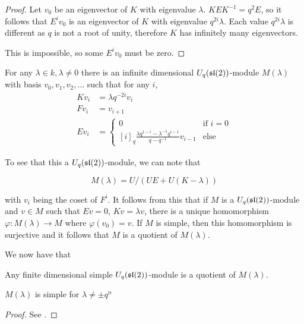 \begin{proof}
    Let $v_0$ be an eigenvector of $K$ with eigenvalue $\lambda$. $KEK^{-1} =
    q^2 E$, so it follows that $E^i v_0$ is an eigenvector of $K$ with
    eigenvalue $q^{2i}\lambda$. Each value $q^{2i}\lambda$ is different as $q$
    is not a root of unity, therefore $K$ has infinitely many eigenvectors. 

    This is impossible, so some $E^i v_0$ must be zero.
\end{proof}

For any $\lambda \in k, \lambda \neq 0$ there is an infinite dimensional
$U_q(\mathfrak{sl}(2))$-module $M(\lambda)$ with basis $v_0, v_1, v_2, \ldots$ such that
for any $i$,
\begin{align}
    Kv_i &= \lambda q^{-2i}v_i \\
    Fv_i &= v_{i+1} \\
    Ev_i &= \begin{cases} 0 & \text{if $i = 0$} \\
                          [i]_q \frac{\lambda q^{1-i} - \lambda^{-1}q^{i-1}}{q - q^{-1}}v_{i-1} & \text{else}
            \end{cases}
\end{align}

To see that this a $U_q(\mathfrak{sl}(2))$-module, we can note that 

\begin{equation}
    M(\lambda) = U/(UE + U(K-\lambda))
\end{equation}

with $v_i$ being the coset of $F^i$. It follows from this that if $M$ is a
$U_q(\mathfrak{sl}(2))$-module and $v \in M$ such that $Ev = 0$, $Kv = \lambda v$, there
is a unique homomorphism $\varphi: M(\lambda) \to M$ where $\varphi(v_0) = v$.
If $M$ is simple, then this homomorphism is surjective and it follows that $M$
is a quotient of $M(\lambda)$. 

We now have that 
\begin{claim}
    Any finite dimensional simple $U_q(\mathfrak{sl}(2))$-module is a quotient of $M(\lambda)$.
\end{claim}

\begin{claim}
    $M(\lambda)$ is simple for $\lambda \neq \pm q^n$
\end{claim}

\begin{proof}
    See \cite{Jantzen1996}.
\end{proof}

